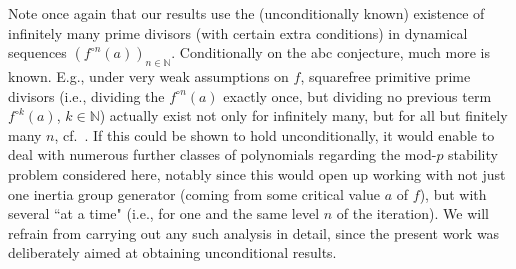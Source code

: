 \documentclass[a4paper]{amsart}
\begin{document}
    
Note once again that our results use the (unconditionally known) existence of infinitely many prime divisors (with certain extra conditions) in dynamical sequences $(f^{\circ n}(a))_{n\in \mathbb{N}}$. Conditionally on the abc conjecture, much more is known. E.g., under very weak assumptions on $f$, squarefree primitive prime divisors (i.e., dividing the $f^{\circ n}(a)$ exactly once, but dividing no previous term $f^{\circ k}(a)$, $k\in \mathbb{N}$) actually exist not only for infinitely many, but for all but finitely many $n$, cf.\ \cite{GNT}. If this could be shown to hold unconditionally, it would enable to deal with numerous further classes of polynomials regarding the mod-$p$ stability problem considered here, notably since this would open up working with not just one inertia group generator (coming from some critical value $a$ of $f$), but with several ``at a time" (i.e., for one and the same level $n$ of the iteration). We will refrain from carrying out any such analysis in detail, since the present work was deliberately aimed at obtaining unconditional results.
  
 
\appendix
\end{document}
